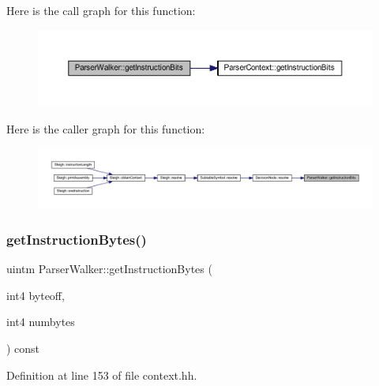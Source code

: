 Here is the call graph for this function\+:
\nopagebreak
\begin{figure}[H]
\begin{center}
\leavevmode
\includegraphics[width=350pt]{class_parser_walker_af78d60807ac439bf2af102516f257cc8_cgraph}
\end{center}
\end{figure}
Here is the caller graph for this function\+:
\nopagebreak
\begin{figure}[H]
\begin{center}
\leavevmode
\includegraphics[width=350pt]{class_parser_walker_af78d60807ac439bf2af102516f257cc8_icgraph}
\end{center}
\end{figure}
\mbox{\label{class_parser_walker_ad986695377d62eeb98db856c34db6aa7}} 
\subsubsection{\texorpdfstring{getInstructionBytes()}{getInstructionBytes()}}
{\footnotesize\ttfamily uintm Parser\+Walker\+::get\+Instruction\+Bytes (\begin{DoxyParamCaption}\item[{int4}]{byteoff,  }\item[{int4}]{numbytes }\end{DoxyParamCaption}) const\hspace{0.3cm}{\ttfamily [inline]}}



Definition at line 153 of file context.\+hh.


